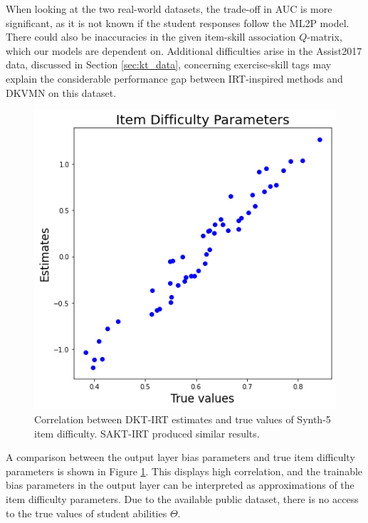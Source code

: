 When looking at the two real-world datasets, the trade-off in AUC is more significant, as it is not known if the student responses follow the ML2P model. There could also be inaccuracies in the given item-skill association $Q$-matrix, which our models are dependent on. Additional difficulties arise in the Assist2017 data, discussed in Section \ref{sec:kt_data}, concerning exercise-skill tags may explain the considerable performance gap between IRT-inspired methods and DKVMN on this dataset.

\begin{figure}[h]
  \centering
  \includegraphics[width=.5\textwidth]{img/kt_irt/synth5_diff_est_lstm.png}
  \caption{Correlation between DKT-IRT estimates and true values of Synth-5 item difficulty. SAKT-IRT produced similar results.}
  \label{fig:synth5_diff}
\end{figure}

A comparison between the output layer bias parameters and true item difficulty parameters is shown in Figure \ref{fig:synth5_diff}. This displays high correlation, and the trainable bias parameters in the output layer can be interpreted as approximations of the item difficulty parameters. Due to the available public dataset, there is no access to the true values of student abilities $\Theta$.

